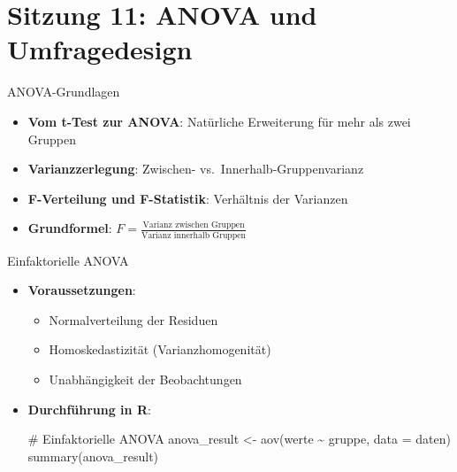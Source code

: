 \documentclass[
  ignorenonframetext,
]{beamer}
\newenvironment{Shaded}{\begin{snugshade}}{\end{snugshade}}
\newcommand{\AttributeTok}[1]{\textcolor[rgb]{0.40,0.45,0.13}{#1}}
\newcommand{\CommentTok}[1]{\textcolor[rgb]{0.37,0.37,0.37}{#1}}
\newcommand{\FunctionTok}[1]{\textcolor[rgb]{0.28,0.35,0.67}{#1}}
\newcommand{\NormalTok}[1]{\textcolor[rgb]{0.00,0.23,0.31}{#1}}
\newcommand{\OtherTok}[1]{\textcolor[rgb]{0.00,0.23,0.31}{#1}}
\newcommand{\SpecialCharTok}[1]{\textcolor[rgb]{0.37,0.37,0.37}{#1}}
\providecommand{\tightlist}{%
  \setlength{\itemsep}{0pt}\setlength{\parskip}{0pt}}
\begin{document}
\section{Sitzung 11: ANOVA und
Umfragedesign}\label{sitzung-11-anova-und-umfragedesign}

\begin{frame}{ANOVA-Grundlagen}
\protect{}\label{anova-grundlagen}
\begin{itemize}
\tightlist
\item
  \textbf{Vom t-Test zur ANOVA}: Natürliche Erweiterung für mehr als
  zwei Gruppen
\item
  \textbf{Varianzzerlegung}: Zwischen- vs.~Innerhalb-Gruppenvarianz
\item
  \textbf{F-Verteilung und F-Statistik}: Verhältnis der Varianzen
\item
  \textbf{Grundformel}:
  \(F = \frac{\text{Varianz zwischen Gruppen}}{\text{Varianz innerhalb Gruppen}}\)
\end{itemize}
\end{frame}

\begin{frame}[fragile]{Einfaktorielle ANOVA}
\protect{}\label{einfaktorielle-anova}
\begin{itemize}
\item
  \textbf{Voraussetzungen}:

  \begin{itemize}
  \tightlist
  \item
    Normalverteilung der Residuen
  \item
    Homoskedastizität (Varianzhomogenität)
  \item
    Unabhängigkeit der Beobachtungen
  \end{itemize}
\item
  \textbf{Durchführung in R}:

\begin{Shaded}
\begin{Highlighting}[]
\CommentTok{\# Einfaktorielle ANOVA}
\NormalTok{anova\_result }\OtherTok{\textless{}{-}} \FunctionTok{aov}\NormalTok{(werte }\SpecialCharTok{\textasciitilde{}}\NormalTok{ gruppe, }\AttributeTok{data =}\NormalTok{ daten)}
\FunctionTok{summary}\NormalTok{(anova\_result)}
\end{Highlighting}
\end{Shaded}
\end{itemize}
\end{frame}
\end{document}
